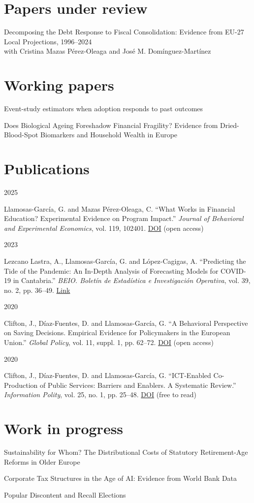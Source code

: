 \documentclass[11pt,a4paper]{article}
\newcommand{\entry}[2]{\begin{minipage}[t]{2.6cm}\sffamily\small\textcolor{muted}{#1}\end{minipage}%
  \begin{minipage}[t]{\linewidth-2.6cm}\raggedright #2\end{minipage}\par\vspace{4pt}}
\begin{document}
\section{Papers under review}
\entry{}{Decomposing the Debt Response to Fiscal Consolidation: Evidence from EU-27 Local Projections, 1996–2024\\{\small\color{muted}with Cristina Mazas Pérez-Oleaga and José M. Domínguez-Martínez}}

\section{Working papers}
\entry{}{Event-study estimators when adoption responds to past outcomes}
\entry{}{Does Biological Ageing Foreshadow Financial Fragility? Evidence from Dried-Blood-Spot Biomarkers and Household Wealth in Europe}

\section{Publications}
\entry{2025}{Llamosas-García, G. and Mazas Pérez-Oleaga, C. ``What Works in Financial Education? Experimental Evidence on Program Impact.'' \emph{Journal of Behavioral and Experimental Economics}, vol. 119, 102401. \href{https://doi.org/10.1016/j.socec.2025.102401}{\color{accent}DOI} (open access)}
\entry{2023}{Lezcano Lastra, A., Llamosas-García, G. and López-Cagigas, A. ``Predicting the Tide of the Pandemic: An In-Depth Analysis of Forecasting Models for COVID-19 in Cantabria.'' \emph{BEIO. Boletín de Estadística e Investigación Operativa}, vol. 39, no. 2, pp. 36–49. \href{https://portaldelainvestigacion.uma.es/documentos/6501a724df0d06753d5bfb47}{\color{accent}Link}}
\entry{2020}{Clifton, J., Díaz-Fuentes, D. and Llamosas-García, G. ``A Behavioral Perspective on Saving Decisions. Empirical Evidence for Policymakers in the European Union.'' \emph{Global Policy}, vol. 11, suppl. 1, pp. 62–72. \href{https://doi.org/10.1111/1758-5899.12751}{\color{accent}DOI} (open access)}
\entry{2020}{Clifton, J., Díaz-Fuentes, D. and Llamosas-García, G. ``ICT-Enabled Co-Production of Public Services: Barriers and Enablers. A Systematic Review.'' \emph{Information Polity}, vol. 25, no. 1, pp. 25–48. \href{https://doi.org/10.3233/IP-190122}{\color{accent}DOI} (free to read)}

\section{Work in progress}
\entry{}{Sustainability for Whom? The Distributional Costs of Statutory Retirement-Age Reforms in Older Europe}
\entry{}{Corporate Tax Structures in the Age of AI: Evidence from World Bank Data}
\entry{}{Popular Discontent and Recall Elections}
\end{document}
